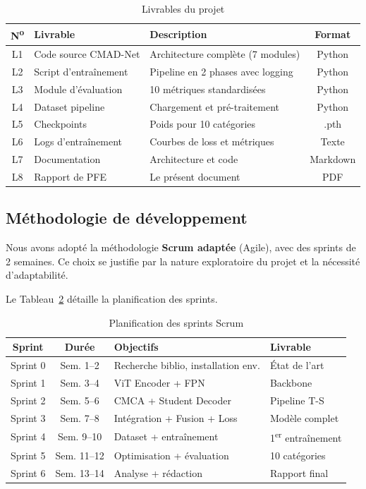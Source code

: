 \documentclass[12pt,a4paper,oneside]{report}
\begin{document}
\begin{table}[H]
\centering
\caption{Livrables du projet}
\label{tab:livrables}
\begin{tabularx}{\textwidth}{c X X c}
\toprule
\textbf{N\textsuperscript{o}} & \textbf{Livrable} & \textbf{Description} & \textbf{Format} \\
\midrule
\rowcolor{tableheader} L1 & Code source CMAD-Net & Architecture complète (7 modules) & Python \\
L2 & Script d'entraînement & Pipeline en 2 phases avec logging & Python \\
\rowcolor{tableheader} L3 & Module d'évaluation & 10 métriques standardisées & Python \\
L4 & Dataset pipeline & Chargement et pré-traitement & Python \\
\rowcolor{tableheader} L5 & Checkpoints & Poids pour 10 catégories & .pth \\
L6 & Logs d'entraînement & Courbes de loss et métriques & Texte \\
\rowcolor{tableheader} L7 & Documentation & Architecture et code & Markdown \\
L8 & Rapport de PFE & Le présent document & PDF \\
\bottomrule
\end{tabularx}
\end{table}

\subsection{Méthodologie de développement}

Nous avons adopté la méthodologie \textbf{Scrum adaptée} (Agile), avec des sprints de 2 semaines. Ce choix se justifie par la nature exploratoire du projet et la nécessité d'adaptabilité.

Le Tableau~\ref{tab:sprints} détaille la planification des sprints.

\begin{table}[H]
\centering
\caption{Planification des sprints Scrum}
\label{tab:sprints}
\begin{tabularx}{\textwidth}{c c X X}
\toprule
\textbf{Sprint} & \textbf{Durée} & \textbf{Objectifs} & \textbf{Livrable} \\
\midrule
\rowcolor{tableheader} Sprint 0 & Sem. 1--2 & Recherche biblio, installation env. & État de l'art \\
Sprint 1 & Sem. 3--4 & ViT Encoder + FPN & Backbone \\
\rowcolor{tableheader} Sprint 2 & Sem. 5--6 & CMCA + Student Decoder & Pipeline T-S \\
Sprint 3 & Sem. 7--8 & Intégration + Fusion + Loss & Modèle complet \\
\rowcolor{tableheader} Sprint 4 & Sem. 9--10 & Dataset + entraînement & 1\textsuperscript{er} entraînement \\
Sprint 5 & Sem. 11--12 & Optimisation + évaluation & 10 catégories \\
\rowcolor{tableheader} Sprint 6 & Sem. 13--14 & Analyse + rédaction & Rapport final \\
\bottomrule
\end{tabularx}
\end{table}
\end{document}
